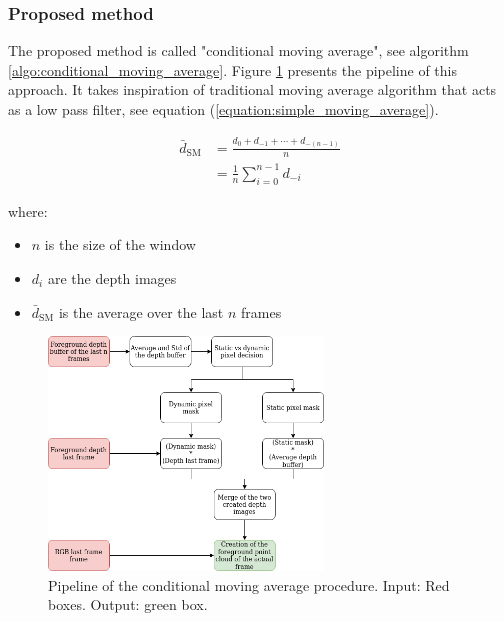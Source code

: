\subsubsection{Proposed method}

The proposed method is called "conditional moving average", see algorithm \ref{algo:conditional_moving_average}. Figure \ref{figure:flickering_backgorund_std} presents the pipeline of this approach. It takes inspiration of traditional moving average algorithm that acts as a low pass filter, see equation (\ref{equation:simple_moving_average}).

\begin{equation}
\label{equation:simple_moving_average}
    \begin{aligned}
    \bar{d}_{\mathrm{SM}} &=\frac{d_{0}+d_{-1}+\cdots+d_{-(n-1)}}{n} \\
    &=\frac{1}{n} \sum_{i=0}^{n-1} d_{-i}
    \end{aligned}
\end{equation}

where:
\begin{itemize}
    \item $n$ is the size of the window
    \item $d_i$ are the depth images
    \item $\bar{d}_{\mathrm{SM}}$ is the average over the last $n$ frames
\end{itemize}

\leavevmode\newline

\begin{figure}[H]
    \centering
    \includegraphics[width=0.65\textwidth]{images/visual_enhancement/flickering_backgorund_std.png}
    \caption{Pipeline of the conditional moving average procedure.  Input: Red boxes. Output: green box.}
    \label{figure:flickering_backgorund_std}
\end{figure}



